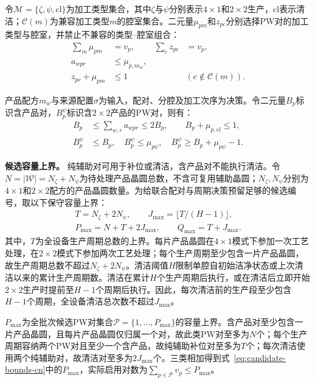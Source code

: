 \documentclass[final,5p,times,twocolumn]{elsarticle}
\begin{document}
令$\mathcal M=\{\zeta,\psi,\mathrm{cl}\}$为加工类型集合，其中$\zeta$与$\psi$分别表示$4\times1$和$2\times2$生产，$\mathrm{cl}$表示清洁；$\mathcal C(m)$为兼容加工类型$m$的腔室集合。二元量$\mu_{pm}$和$z_{pc}$分别选择PW对的加工类型与腔室，并禁止不兼容的类型--腔室组合：
\begin{equation}
\begin{aligned}
\sum_m\mu_{pm}&=v_p, &\sum_c z_{pc}&=v_p,\\
a_{wpr}&\le\mu_{p,m_w},\\
z_{pc}+\mu_{pm}&\le1 &&(c\notin\mathcal C(m)).
\end{aligned}
\label{eq:joint-chamber-cn}
\end{equation}

产品配方$m_w$与来源配置$\sigma$为输入，配对、分腔及加工次序为决策。令二元量$B_p$标识含产品对，$B_p^{\psi}$标识含$2\times2$产品的PW对，则有：
\begin{equation}
\begin{aligned}
B_p&\le\sum_{w,r}a_{wpr}\le2B_p,\qquad B_p+\mu_{p,\mathrm{cl}}\le1,\\
B_p^{\psi}&\le B_p,\quad B_p^{\psi}\le\mu_{p\psi},\quad
B_p^{\psi}\ge B_p+\mu_{p\psi}-1.
\end{aligned}
\label{eq:pair-type-cn}
\end{equation}

\noindent\textbf{候选容量上界。}
纯辅助对可用于补位或清洁，含产品对不能执行清洁。令$N=|\mathcal W|=N_{\zeta}+N_{\psi}$为待处理产品晶圆总数，不含可复用辅助晶圆；$N_{\zeta},N_{\psi}$分别为$4\times1$和$2\times2$配方的产品晶圆数量。为给联合配对与周期决策预留足够的候选编号，取以下保守容量上界：
\begin{equation}
\begin{gathered}
T=N_{\zeta}+2N_{\psi},\qquad J_{\max}=\lfloor T/(H-1)\rfloor,\\
P_{\max}=N+T+2J_{\max},\qquad Q_{\max}=T+J_{\max}.
\end{gathered}
\label{eq:candidate-bounds-cn}
\end{equation}
其中，$T$为全设备生产周期总数的上界。每片产品晶圆在$4\times1$模式下参加一次工艺处理，在$2\times2$模式下参加两次工艺处理；每个生产周期至少包含一片产品晶圆，故生产周期总数不超过$N_{\zeta}+2N_{\psi}$。清洁阈值$H$限制单腔自初始洁净状态或上次清洁以来的累计生产周期数。清洁在累计$H$个生产周期后执行，或在清洁后立即开始$2\times2$生产时提前至$H-1$个周期后执行。因此，每次清洁前的生产段至少包含$H-1$个周期，全设备清洁总次数不超过$J_{\max}$。

$P_{\max}$为全批次候选PW对集合$\mathcal P=\{1,\ldots,P_{\max}\}$的容量上界。含产品对至少包含一片产品晶圆，且每片产品晶圆仅归属一个对，故此类PW对至多为$N$个；每个生产周期容纳两个PW对且至少一个含产品，故纯辅助补位对至多为$T$个；每次清洁使用两个纯辅助对，故清洁对至多为$2J_{\max}$个。三类相加得到式~\eqref{eq:candidate-bounds-cn}中的$P_{\max}$，实际启用对数为$\sum_{p\in\mathcal P}v_p\le P_{\max}$。
\end{document}
